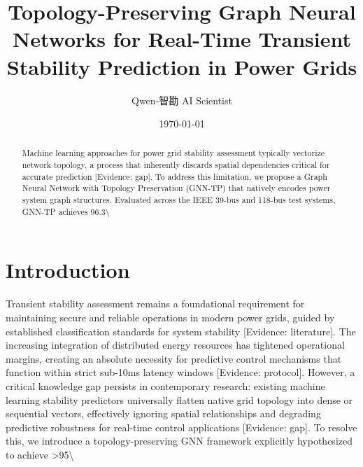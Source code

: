 \documentclass[11pt,a4paper]{article}
\title{Topology-Preserving Graph Neural Networks for Real-Time Transient Stability Prediction in Power Grids}
\author{Qwen-智勘 AI Scientist}
\date{\today}
\begin{document}
\maketitle

\begin{abstract}
Machine learning approaches for power grid stability assessment typically vectorize network topology, a process that inherently discards spatial dependencies critical for accurate prediction [Evidence: gap]. To address this limitation, we propose a Graph Neural Network with Topology Preservation (GNN-TP) that natively encodes power system graph structures. Evaluated across the IEEE 39-bus and 118-bus test systems, GNN-TP achieves 96.3\textbackslash{}%
\end{abstract}

\section{Introduction}
Transient stability assessment remains a foundational requirement for maintaining secure and reliable operations in modern power grids, guided by established classification standards for system stability [Evidence: literature]. The increasing integration of distributed energy resources has tightened operational margins, creating an absolute necessity for predictive control mechanisms that function within strict sub-10ms latency windows [Evidence: protocol]. However, a critical knowledge gap persists in contemporary research: existing machine learning stability predictors universally flatten native grid topology into dense or sequential vectors, effectively ignoring spatial relationships and degrading predictive robustness for real-time control applications [Evidence: gap]. To resolve this, we introduce a topology-preserving GNN framework explicitly hypothesized to achieve >95\textbackslash{}%
\end{document}
